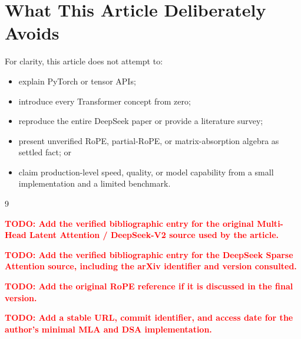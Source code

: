 \documentclass[11pt]{article}
\newcommand{\TODO}[1]{\textcolor{red}{\textbf{TODO: #1}}}
\begin{document}
\section*{What This Article Deliberately Avoids}

For clarity, this article does not attempt to:
\begin{itemize}[leftmargin=*]
    \item explain PyTorch or tensor APIs;
    \item introduce every Transformer concept from zero;
    \item reproduce the entire DeepSeek paper or provide a literature survey;
    \item present unverified RoPE, partial-RoPE, or matrix-absorption algebra
          as settled fact; or
    \item claim production-level speed, quality, or model capability from a
          small implementation and a limited benchmark.
\end{itemize}

\begin{thebibliography}{9}

\TODO{Add the verified bibliographic entry for the original Multi-Head Latent
Attention / DeepSeek-V2 source used by the article.}

\TODO{Add the verified bibliographic entry for the DeepSeek Sparse Attention
source, including the arXiv identifier and version consulted.}

\TODO{Add the original RoPE reference if it is discussed in the final version.}

\TODO{Add a stable URL, commit identifier, and access date for the author's
minimal MLA and DSA implementation.}

\end{thebibliography}
\end{document}
